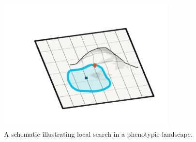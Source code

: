 \begin{figure}[!htbp]
  \includegraphics[width=0.8\textwidth]{img/baldwin_effect}
  \captionsetup{singlelinecheck=off,justification=raggedright}
  \caption[Schematic Illustration of Local Phenotypic Search]{A schematic illustrating local search in a phenotypic landscape.}
     \label{fig:baldwin_effect}
\end{figure}